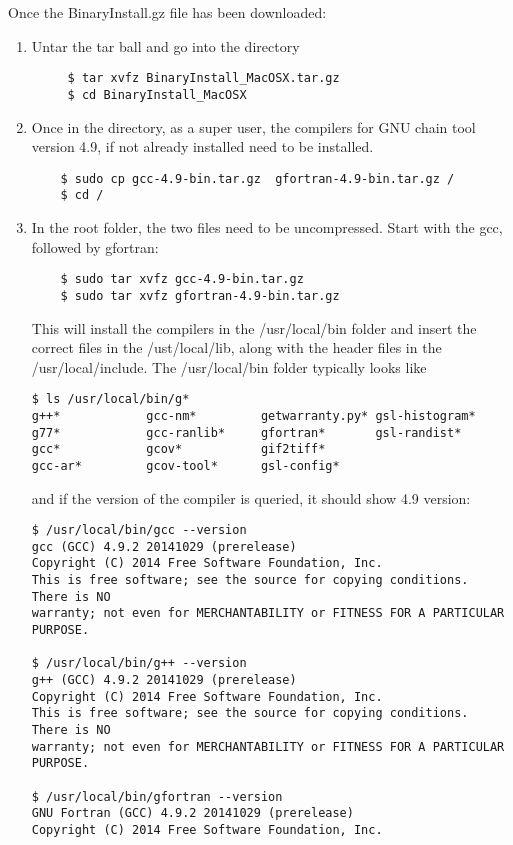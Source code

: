 \documentclass[review]{elsarticle}
\begin{document}
Once the BinaryInstall.gz file has been downloaded:
\begin{enumerate}
\item {\label{unzip_bin}} Untar the tar ball and go into the
  directory
\begin{verbatim}
     $ tar xvfz BinaryInstall_MacOSX.tar.gz
     $ cd BinaryInstall_MacOSX
\end{verbatim}
\item {\label{copy_2root_inst}} Once in the directory, as a super user, the
  compilers for GNU chain tool version 4.9, if not already installed
  need to be installed.
\begin{verbatim}
    $ sudo cp gcc-4.9-bin.tar.gz  gfortran-4.9-bin.tar.gz /
    $ cd /
\end{verbatim}
\item In the root folder, the two files need to be uncompressed. Start
with the gcc, followed by gfortran:
\begin{verbatim}
    $ sudo tar xvfz gcc-4.9-bin.tar.gz
    $ sudo tar xvfz gfortran-4.9-bin.tar.gz
\end{verbatim}
This will install the compilers in the /usr/local/bin folder and insert
the correct files in the /ust/local/lib, along with the header files
in the /usr/local/include. The /usr/local/bin folder typically looks
like

\begin{verbatim}
$ ls /usr/local/bin/g*
g++*            gcc-nm*         getwarranty.py* gsl-histogram*
g77*            gcc-ranlib*     gfortran*       gsl-randist*
gcc*            gcov*           gif2tiff*
gcc-ar*         gcov-tool*      gsl-config*
\end{verbatim}
and if the version of the compiler is queried, it should show 4.9 version:
\begin{verbatim}
$ /usr/local/bin/gcc --version
gcc (GCC) 4.9.2 20141029 (prerelease)
Copyright (C) 2014 Free Software Foundation, Inc.
This is free software; see the source for copying conditions.  There is NO
warranty; not even for MERCHANTABILITY or FITNESS FOR A PARTICULAR PURPOSE.

$ /usr/local/bin/g++ --version
g++ (GCC) 4.9.2 20141029 (prerelease)
Copyright (C) 2014 Free Software Foundation, Inc.
This is free software; see the source for copying conditions.  There is NO
warranty; not even for MERCHANTABILITY or FITNESS FOR A PARTICULAR PURPOSE.

$ /usr/local/bin/gfortran --version
GNU Fortran (GCC) 4.9.2 20141029 (prerelease)
Copyright (C) 2014 Free Software Foundation, Inc.


\end{verbatim}
\end{enumerate}
\end{document}
